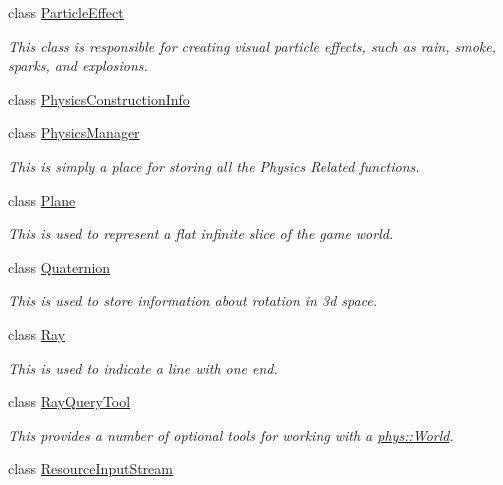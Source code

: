 \begin{DoxyCompactItemize}
class \hyperlink{classphys_1_1ParticleEffect}{ParticleEffect}
\begin{DoxyCompactList}\small\item\em This class is responsible for creating visual particle effects, such as rain, smoke, sparks, and explosions. \item\end{DoxyCompactList}\item 
class \hyperlink{classphys_1_1PhysicsConstructionInfo}{PhysicsConstructionInfo}
\item 
class \hyperlink{classphys_1_1PhysicsManager}{PhysicsManager}
\begin{DoxyCompactList}\small\item\em This is simply a place for storing all the Physics Related functions. \item\end{DoxyCompactList}\item 
class \hyperlink{classphys_1_1Plane}{Plane}
\begin{DoxyCompactList}\small\item\em This is used to represent a flat infinite slice of the game world. \item\end{DoxyCompactList}\item 
class \hyperlink{classphys_1_1Quaternion}{Quaternion}
\begin{DoxyCompactList}\small\item\em This is used to store information about rotation in 3d space. \item\end{DoxyCompactList}\item 
class \hyperlink{classphys_1_1Ray}{Ray}
\begin{DoxyCompactList}\small\item\em This is used to indicate a line with one end. \item\end{DoxyCompactList}\item 
class \hyperlink{classphys_1_1RayQueryTool}{RayQueryTool}
\begin{DoxyCompactList}\small\item\em This provides a number of optional tools for working with a \hyperlink{classphys_1_1World}{phys::World}. \item\end{DoxyCompactList}\item 
class \hyperlink{classphys_1_1ResourceInputStream}{ResourceInputStream}

\end{DoxyCompactItemize}
